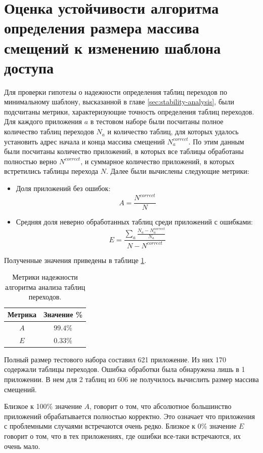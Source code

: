 \documentclass{mipt-thesis-bs}
\begin{document}
    \section{Оценка устойчивости алгоритма определения размера массива смещений к изменению шаблона доступа}
    Для проверки гипотезы о надежности определения таблиц переходов по минимальному шаблону, высказанной в главе \ref{sec:stability-analysis}, были подсчитаны метрики, характеризующие точность определения таблиц переходов. Для каждого приложения $a$ в тестовом наборе были посчитаны полное количество таблиц переходов $N_a$ и количество таблиц, для которых удалось установить адрес начала и конца массива смещений $N^{correct}_a$. По этим данным были посчитаны количество приложений, в которых все таблицы обработаны полностью верно $N^{correct}$, и суммарное количество приложений, в которых встретились таблицы перехода $N$. Далее были вычислены следующие метрики:
    \begin{itemize}
        \item Доля приложений без ошибок:
        $$A = \frac{N^{correct}}{N}$$
        \item Средняя доля неверно обработанных таблиц среди приложений с ошибками:
        $$E = \frac{\sum_a \frac{N_a - N^{correct}_a}{N_a}}{N - N^{correct}}$$
    \end{itemize}

    Полученные значения приведены в таблице \ref{tab:metrics}.

    \begin{table}[h!]
        \centering
        \begin{tabular}{|c|c|}
            \hline
            Метрика & Значение \% \\ \hline
            $A$ & $99.4\%$ \\ \hline
            $E$ &  $0.33\%$ \\ \hline
        \end{tabular}
        \caption{Метрики надежности алгоритма анализа таблиц переходов.}
        \label{tab:metrics}
    \end{table}

    Полный размер тестового набора составил 621 приложение. Из них 170 содержали таблицы переходов. Ошибка обработки была обнаружена лишь в 1 приложении. В нем для 2 таблиц из 606 не получилось вычислить размер массива смещений.

    Близкое к 100\% значение $A$, говорит о том, что абсолютное большинство приложений обрабатывается полностью корректно. Это означает что приложения с проблемными случаями встречаются очень редко. Близкое к 0\% значение $E$ говорит о том, что в тех приложениях, где ошибки все-таки встречаются, их очень мало.
\end{document}
